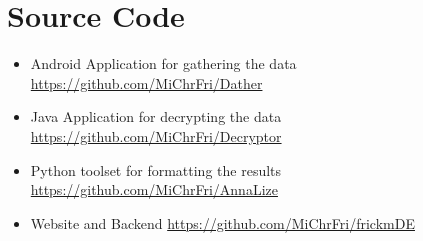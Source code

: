 \chapter{Source Code}


\begin{itemize}
\item Android Application for gathering the data
\subitem \url{https://github.com/MiChrFri/Dather}

\item Java Application for decrypting the data
\subitem \url{https://github.com/MiChrFri/Decryptor}

\item Python toolset for formatting the results
\subitem \url{https://github.com/MiChrFri/AnnaLize}

\item Website and Backend
\subitem \url{https://github.com/MiChrFri/frickmDE}

\end{itemize}
